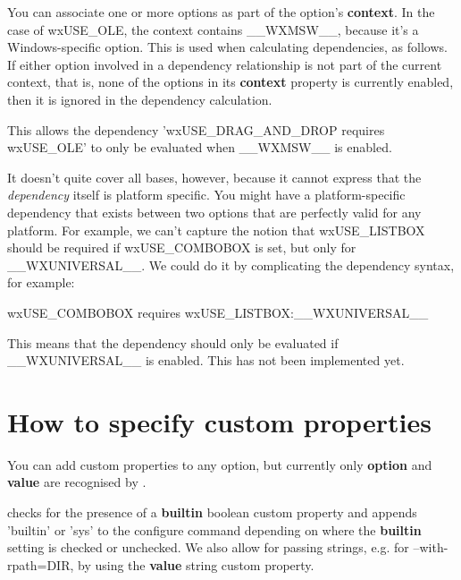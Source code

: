 You can associate one or more options as part of the
option's {\bf context}. In the case of wxUSE_OLE,
the context contains __WXMSW__, because it's a Windows-specific
option. This is used when calculating dependencies, as
follows. If either option involved in a dependency
relationship is not part of the current context, that
is, none of the options in its {\bf context} property is currently
enabled, then it is ignored in the dependency calculation.

This allows the dependency 'wxUSE_DRAG_AND_DROP requires wxUSE_OLE'
to only be evaluated when __WXMSW__ is enabled.

It doesn't quite cover all bases, however, because
it cannot express that the {\it dependency} itself
is platform specific. You might have a platform-specific
dependency that exists between two options that are
perfectly valid for any platform. For example, we
can't capture the notion that wxUSE_LISTBOX
should be required if wxUSE_COMBOBOX is set,
but only for __WXUNIVERSAL__. We could do it
by complicating the dependency syntax, for example:

wxUSE_COMBOBOX requires wxUSE_LISTBOX:__WXUNIVERSAL__

This means that the dependency should only be
evaluated if __WXUNIVERSAL__ is enabled.
This has not been implemented yet.

\section{How to specify custom properties}\label{customproperties}

You can add custom properties to any option, but
currently only {\bf option} and {\bf value} are
recognised by \ctshortname.

\ctshortname checks for the presence of a
{\bf builtin} boolean custom property and appends 'builtin' or
'sys' to the configure command depending on where
the {\bf builtin} setting is checked or unchecked.
We also allow for passing strings, e.g. for --with-rpath=DIR,
by using the {\bf value} string custom property.

\begin{comment}

\begin{helpglossary}

\gloss{thing}\label{thing}

A glossary entry.

\end{helpglossary}
\end{comment}




